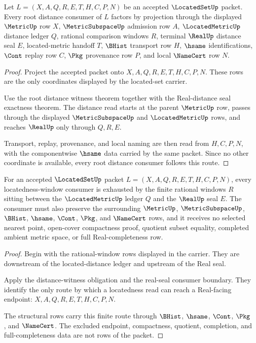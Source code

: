 \begin{theorem}
\label{thm:locatedset-root-distance-obligation}
Let $L=(X,A,Q,R,E,T,H,C,P,N)$ be an accepted $\LocatedSetUp$ packet. Every root distance consumer of $L$ factors by projection through the displayed $\MetricUp$ row $X$, $\MetricSubspaceUp$ admission row $A$, $\LocatedMetricUp$ distance ledger $Q$, rational comparison windows $R$, terminal $\RealUp$ distance seal $E$, located-metric handoff $T$, $\BHist$ transport row $H$, $\hsame$ identifications, $\Cont$ replay row $C$, $\Pkg$ provenance row $P$, and local $\NameCert$ row $N$.
\end{theorem}
\begin{proof}
Project the accepted packet onto $X,A,Q,R,E,T,H,C,P,N$. These rows are the only coordinates displayed by the located-set carrier.

Use the root distance witness theorem together with the Real-distance seal exactness theorem. The distance read starts at the parent $\MetricUp$ row, passes through the displayed $\MetricSubspaceUp$ and $\LocatedMetricUp$ rows, and reaches $\RealUp$ only through $Q,R,E$.

Transport, replay, provenance, and local naming are then read from $H,C,P,N$, with the componentwise $\hsame$ data carried by the same packet. Since no other coordinate is available, every root distance consumer follows this route.
\end{proof}

\begin{theorem}
\label{thm:locatedset-root-locatedness-window}
For an accepted $\LocatedSetUp$ packet $L=(X,A,Q,R,E,T,H,C,P,N)$, every locatedness-window consumer is exhausted by the finite rational windows $R$ sitting between the $\LocatedMetricUp$ ledger $Q$ and the $\RealUp$ seal $E$. The consumer must also preserve the surrounding $\MetricUp$, $\MetricSubspaceUp$, $\BHist$, $\hsame$, $\Cont$, $\Pkg$, and $\NameCert$ rows, and it receives no selected nearest point, open-cover compactness proof, quotient subset equality, completed ambient metric space, or full Real-completeness row.
\end{theorem}
\begin{proof}
Begin with the rational-window rows displayed in the carrier. They are downstream of the located-distance ledger and upstream of the Real seal.

Apply the distance-witness obligation and the real-seal consumer boundary. They identify the only route by which a locatedness read can reach a Real-facing endpoint: $X,A,Q,R,E,T,H,C,P,N$.

The structural rows carry this finite route through $\BHist$, $\hsame$, $\Cont$, $\Pkg$, and $\NameCert$. The excluded endpoint, compactness, quotient, completion, and full-completeness data are not rows of the packet.
\end{proof}

